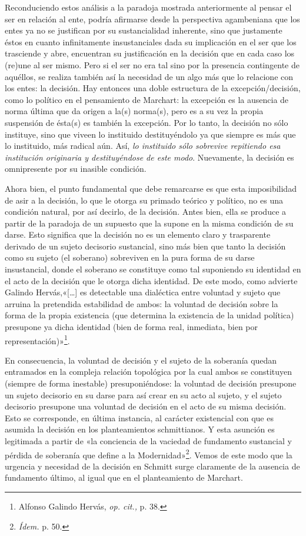 Reconduciendo estos análisis a la paradoja mostrada anteriormente al pensar el ser en relación al ente, podría afirmarse desde la perspectiva agambeniana que los entes ya no se justifican por su sustancialidad inherente, sino que justamente éstos en cuanto infinitamente insustanciales dada su implicación en el ser que los trasciende y abre, encuentran su justificación en la decisión que en cada caso los (re)une al ser mismo. Pero si el ser no era tal sino por la presencia contingente de aquéllos, se realiza también así la necesidad de un algo más que lo relacione con los entes: la decisión. Hay entonces una doble estructura de la excepción/decisión, como lo político en el pensamiento de Marchart: la excepción es la ausencia de norma última que da origen a la(s) norma(s), pero es a su vez la propia suspensión de ésta(s) es también la excepción. Por lo tanto, la decisión no sólo instituye, sino que viveen lo instituido destituyéndolo ya que siempre es más que lo instituido, más radical aún. Así, \emph{lo instituido sólo sobrevive repitiendo esa institución originaria y destituyéndose de este modo}. Nuevamente, la decisión es omnipresente por su inasible condición.

Ahora bien, el punto fundamental que debe remarcarse es que esta imposibilidad de asir a la decisión, lo que le otorga su primado teórico y político, no es una condición natural, por así decirlo, de la decisión. Antes bien, ella se produce a partir de la paradoja de un supuesto que la supone en la misma condición de su darse. Esto significa que la decisión no es un elemento claro y trasparente derivado de un sujeto decisorio sustancial, sino más bien que tanto la decisión como su sujeto (el soberano) sobreviven en la pura forma de su darse insustancial, donde el soberano se constituye como tal suponiendo su identidad en el acto de la decisión que le otorga dicha identidad. De este modo, como advierte Galindo Hervás,«{[}\ldots{]} es detectable una dialéctica entre voluntad y sujeto que arruina la pretendida estabilidad de ambos: la voluntad de decisión sobre la forma de la propia existencia (que determina la existencia de la unidad política) presupone ya dicha identidad (bien de forma real, inmediata, bien por representación)»\footnote{Alfonso Galindo Hervás, \emph{op. cit.,} p. 38.}.

En consecuencia, la voluntad de decisión y el sujeto de la soberanía quedan entramados en la compleja relación topológica por la cual ambos se constituyen (siempre de forma inestable) presuponiéndose: la voluntad de decisión presupone un sujeto decisorio en su darse para así crear en su acto al sujeto, y el sujeto decisorio presupone una voluntad de decisión en el acto de su misma decisión. Esto se corresponde, en última instancia, al carácter existencial con que es asumida la decisión en los planteamientos schmittianos. Y esta asunción es legitimada a partir de «la conciencia de la vaciedad de fundamento sustancial y pérdida de soberanía que define a la Modernidad»\footnote{\emph{Ídem.} p. 50.}. Vemos de este modo que la urgencia y necesidad de la decisión en Schmitt surge claramente de la ausencia de fundamento último, al igual que en el planteamiento de Marchart.

